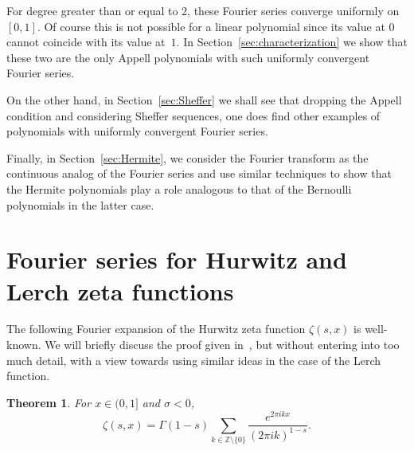 \documentclass[11pt,a4paper]{amsart}
\newcommand{\Z}{\mathbb{Z}}
\theoremstyle{plain}
\newtheorem{theorem}{Theorem}
\theoremstyle{plain}
\theoremstyle{plain}
\theoremstyle{remark}
\begin{document}
For degree greater than or equal to $2$, these Fourier series converge uniformly on $[0,1]$. Of course this is not possible for a linear polynomial since its value at $0$ cannot coincide with its value at~$1$. In Section~\ref{sec:characterization} we show that these two are the only Appell polynomials with such uniformly convergent Fourier series.

On the other hand, in Section~\ref{sec:Sheffer} we shall see that dropping the Appell condition and considering Sheffer sequences, one does find other examples of polynomials with uniformly convergent Fourier series.

Finally, in Section~\ref{sec:Hermite}, we consider the Fourier transform as the continuous analog of the Fourier series and use similar techniques to show that the Hermite polynomials play a role analogous to that of the Bernoulli polynomials in the latter case.



\section{Fourier series for Hurwitz and Lerch zeta functions}
\label{sec:HL}



The following Fourier expansion of the Hurwitz zeta function $\zeta(s,x)$ is well-known. We will briefly discuss the proof given in~\cite{NRV-Lerch-Fou}, but without entering into too much detail, with a view towards using similar ideas in the case of the Lerch function.

\begin{theorem}
\label{T:SFHurwitz}
For $x\in (0,1]$ and $\sigma<0$,
\begin{equation}
\label{eq:SFHurwitz}
  \zeta(s,x) = \Gamma(1-s)\sum_{k\in\Z \setminus \{0\}}\frac{e^{2\pi ikx}}{(2\pi i k)^{1-s}}.
\end{equation}
\end{theorem}
\end{document}
